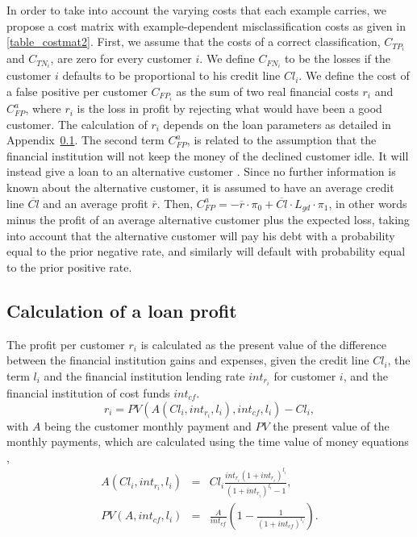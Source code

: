   In order to take into account the varying costs that each example carries, we propose a cost 
  matrix with example-dependent misclassification costs as given in \tablename{ 
  \ref{table_costmat2}}. First, we assume that the costs of a correct classification, $C_{TP_i}$ 
  and $C_{TN_i}$, are zero for every customer $i$. We define $C_{FN_i}$ to be the losses if the 
  customer $i$ defaults to be proportional to his credit line $Cl_i$. We define the cost of a false 
  positive per customer $C_{FP_i}$ as the sum of two real financial costs $r_i$ and $C^a_{FP}$,
  where $r_i$ is the loss in profit by rejecting what would have been a good customer. The 
  calculation of $r_i$ depends on the loan parameters as detailed in Appendix~\ref{app_profit}.
  The second term $C^a_{FP}$, is related to the assumption that the financial institution will not 
  keep the money of the declined customer idle. It will instead give a loan to an alternative 
  customer \citep{Nayak1997}. Since no further information is known about the alternative customer, 
  it is assumed to have an average credit line $\overline{Cl}$ and an average profit $\overline{r}$.
  Then, \mbox{$C^a_{FP}=- \overline{r} \cdot \pi_0+\overline{Cl}\cdot L_{gd} \cdot \pi_1$}, in 
  other words minus the profit of an average alternative customer plus the expected loss, taking 
  into account that the alternative customer will pay his debt with a probability equal to the 
  prior negative rate, and similarly will default with probability equal to the prior positive rate.

  \subsection{Calculation of a loan profit}\label{app_profit}
    The profit per customer $r_i$ is calculated as the present value of the difference between the 
    financial institution gains and expenses, given the credit line $Cl_i$, the term $l_i$ and the 
    financial institution lending rate $int_{r_i}$ for customer $i$, and the financial institution 
    of cost funds $int_{cf}$.
    \begin{equation}
      r_i= PV(A(Cl_i,int_{r_i},l_i),int_{cf},l_i)-Cl_i,
    \end{equation}
    with $A$ being the customer monthly payment and $PV$ the present value of the monthly payments,
    which are calculated using the time value of money equations \citep{Lawrence2012},
    \begin{eqnarray}
      A(Cl_i,int_{r_i},l_i) &=&  Cl_i \frac{int_{r_i}(1+int_{r_i})^{l_i}}{(1+int_{r_i})^{l_i}-1}, \\
      PV(A,int_{cf},l_i) &=& \frac{A}{int_{cf}} \left(1-\frac{1}{(1+int_{cf})^{l_i}} \right).
    \end{eqnarray}

